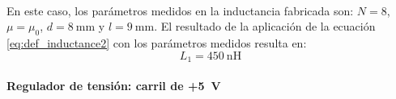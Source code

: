 \paragraph{}
En este caso, los par\'ametros medidos en la inductancia fabricada son: $N = 8$, $\mu = \mu_0$, $d = \SI{8}{\milli\metre}$ y $l = \SI{9}{\milli\metre}$. El resultado de la aplicaci\'on de la ecuaci\'on \ref{eq:def_inductance2} con los par\'ametros medidos resulta en: $$L_1 = \SI{450}{\nano\henry}$$


\paragraph{}
\paragraph{Regulador de tensi\'on: carril de +\SI{5}{\volt}}
